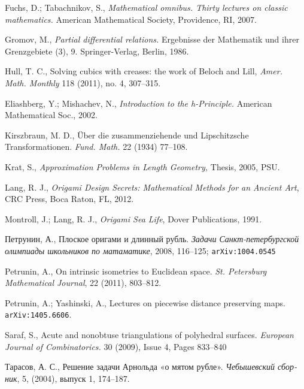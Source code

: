 \begin{thebibliography}{52}
Fuchs, D.; 
Tabachnikov, S.,
\textit{Mathematical omnibus.
Thirty lectures on classic mathematics.} 
American Mathematical Society, Providence, RI, 2007. 


  Gromov, M., 
\textit{Partial differential relations.} 
Ergebnisse der Mathematik und ihrer Grenzgebiete (3), 9. 
Springer-Verlag, Berlin, 1986.

 Hull, T. C.,
Solving cubics with creases: the work of Beloch and Lill, 
\textit{Amer. Math. Monthly} 118 (2011), no. 4, 307--315.

 Eliashberg, Y.;  Mishachev, N., \textit{Introduction to the \textit{h}-Principle.} 
American Mathematical Soc., 2002.

 Kirszbraun, M. D., 
\"Uber die zusammenziehende und Lipschitzsche Transformationen. 
\textit{Fund. Math.} 22 (1934) 77--108.

 Krat, S., 
\textit{Approximation Problems in Length Geometry,} 
Thesis, 2005, PSU.

 Lang, R. J., 
\textit{Origami Design Secrets: Mathematical Methods for an Ancient Art},
CRC Press, Boca Raton, FL, 2012.


Montroll, J.;  
Lang, R. J., 
\textit{Origami Sea Life},
Dover Publications, 1991.

\begin{otherlanguage}{russian}
Петрунин, А., 
Плоское оригами и длинный рубль.
\textit{Задачи Санкт-петербургской олимпиады школьников по матаматике}, 2008, 116--125; \texttt{arXiv:1004.0545}
\end{otherlanguage}

 Petrunin, A.,
On intrinsic isometries to Euclidean space.
\textit{St. Petersburg Mathematical Journal}, 22 (2011), 803--812.

Petrunin, A.; 
Yashinski, A.,
Lectures on piecewise distance preserving maps.
\texttt{arXiv:1405.6606}.

  Saraf, S., 
Acute and nonobtuse triangulations of polyhedral surfaces.
\textit{European Journal of Combinatorics.} 
30 (2009), Issue 4, Pages 833--840

\begin{otherlanguage}{russian}
Тарасов, А. С.,
Решение задачи Арнольда «о мятом рубле».
\textit{Чебышевский сборник},  
5, (2004), выпуск 1, 174--187.
\end{otherlanguage}


\end{thebibliography}
